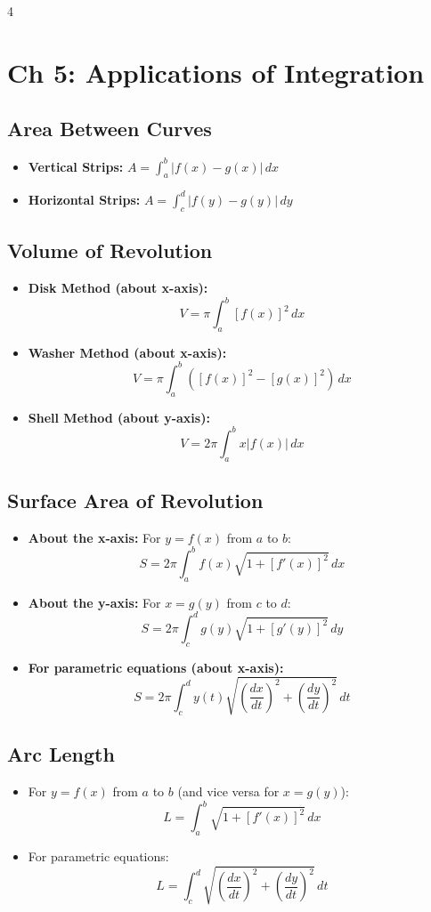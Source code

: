 \documentclass[8pt, landscape, a4paper]{scrartcl}
\begin{document}
\begin{multicols*}{4}
\section*{Ch 5: Applications of Integration}
\subsection*{Area Between Curves}
\begin{itemize}
    \item \textbf{Vertical Strips:} $A = \int_{a}^{b} |f(x) - g(x)| \, dx$
    \item \textbf{Horizontal Strips:} $A = \int_{c}^{d} |f(y) - g(y)| \, dy$
\end{itemize}

\subsection*{Volume of Revolution}
\begin{itemize}
    \item \textbf{Disk Method (about x-axis):}
    \[ V = \pi \int_{a}^{b} {[f(x)]}^2 \, dx \]
    \item \textbf{Washer Method (about x-axis):}
    \[ V = \pi \int_{a}^{b} \left({[f(x)]}^2 - {[g(x)]}^2\right) \, dx \]
    \item \textbf{Shell Method (about y-axis):}
    \[ V = 2\pi \int_{a}^{b} x|f(x)| \, dx \]
\end{itemize}

\subsection*{Surface Area of Revolution}
\begin{itemize}
    \item \textbf{About the x-axis:}
    For $y = f(x)$ from $a$ to $b$:
    \[ S = 2\pi \int_{a}^{b} f(x) \sqrt{1 + {[f'(x)]}^2} \, dx \]
    \item \textbf{About the y-axis:}
    For $x = g(y)$ from $c$ to $d$:
    \[ S = 2\pi \int_{c}^{d} g(y) \sqrt{1 + {[g'(y)]}^2} \, dy \]
    \item \textbf{For parametric equations (about x-axis):}
    \[ S = 2\pi \int_c^d y(t) \sqrt{{\left(\frac{dx}{dt}\right)}^2 + {\left(\frac{dy}{dt}\right)}^2} \, dt \]
\end{itemize}

\subsection*{Arc Length}
\begin{itemize}
    \item For $y = f(x)$ from $a$ to $b$ (and vice versa for $x = g(y)$):
    \[ L = \int_{a}^{b} \sqrt{1 + {[f'(x)]}^2} \, dx \]
    \item For parametric equations:
    \[L = \int_c^d \sqrt{{\left(\frac{dx}{dt}\right)}^2 + {\left(\frac{dy}{dt}\right)}^2} \,dt\]
\end{itemize}


\end{multicols*}
\end{document}
